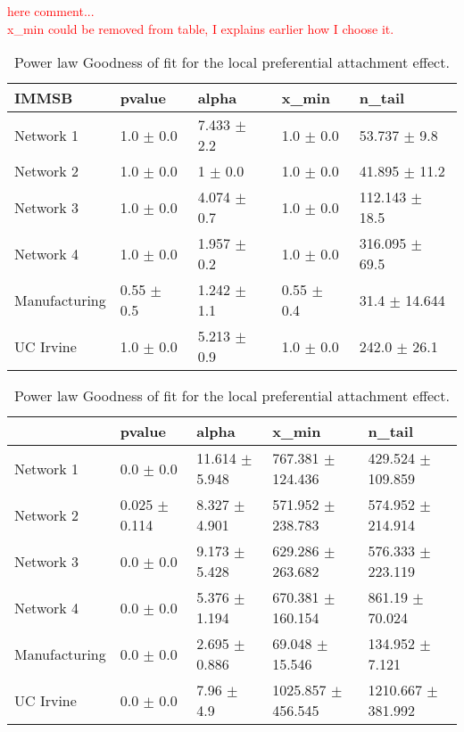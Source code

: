 \documentclass[a4paper, 12pt]{article}
\begin{document}
\textcolor{red}{here comment...} ~\\
\textcolor{red}{x\_min could be removed from table, I explains earlier how I choose it.}





\begin{table}
    \label{table:local_gof}
    \caption{Power law Goodness of fit for the local preferential attachment effect.}
    \begin{tabular}{lllll}                                                                                    
    \hline                                                                
        \textbf{IMMSB}  & pvalue         & alpha           & x\_min          & n\_tail             \\            
    \hline                                                                                                    
    Network 1     & 1.0 $\pm$ 0.0    & 7.433 $\pm$ 2.2 & 1.0 $\pm$ 0.0    & 53.737 $\pm$ 9.8   \\
    Network 2     & 1.0 $\pm$ 0.0    & 1 $\pm$ 0.0    & 1.0 $\pm$ 0.0    & 41.895 $\pm$ 11.2  \\                             
    Network 3     & 1.0 $\pm$ 0.0    & 4.074 $\pm$ 0.7 & 1.0 $\pm$ 0.0    & 112.143 $\pm$ 18.5 \\                
    Network 4     & 1.0 $\pm$ 0.0    & 1.957 $\pm$ 0.2 & 1.0 $\pm$ 0.0    & 316.095 $\pm$ 69.5 \\
    Manufacturing & 0.55 $\pm$ 0.5 & 1.242 $\pm$ 1.1 & 0.55 $\pm$ 0.4 & 31.4 $\pm$ 14.644    \\              
    UC Irvine     & 1.0 $\pm$ 0.0    & 5.213 $\pm$ 0.9 & 1.0 $\pm$ 0.0    & 242.0 $\pm$ 26.1   \\                
    \hline                                                                
    \end{tabular}    

    \begin{tabular}{lllll}
    \hline
    & pvalue          & alpha            & x\_min                & n\_tail               \\
    \hline
    Network 1     & 0.0 $\pm$ 0.0     & 11.614 $\pm$ 5.948 & 767.381 $\pm$ 124.436  & 429.524 $\pm$ 109.859  \\
    Network 2     & 0.025 $\pm$ 0.114 & 8.327 $\pm$ 4.901  & 571.952 $\pm$ 238.783  & 574.952 $\pm$ 214.914  \\
    Network 3     & 0.0 $\pm$ 0.0     & 9.173 $\pm$ 5.428  & 629.286 $\pm$ 263.682  & 576.333 $\pm$ 223.119  \\
    Network 4     & 0.0 $\pm$ 0.0     & 5.376 $\pm$ 1.194  & 670.381 $\pm$ 160.154  & 861.19 $\pm$ 70.024    \\
    Manufacturing & 0.0 $\pm$ 0.0     & 2.695 $\pm$ 0.886  & 69.048 $\pm$ 15.546    & 134.952 $\pm$ 7.121    \\
    UC Irvine     & 0.0 $\pm$ 0.0     & 7.96 $\pm$ 4.9     & 1025.857 $\pm$ 456.545 & 1210.667 $\pm$ 381.992 \\
    \hline
    \end{tabular}


\end{table}
\end{document}
